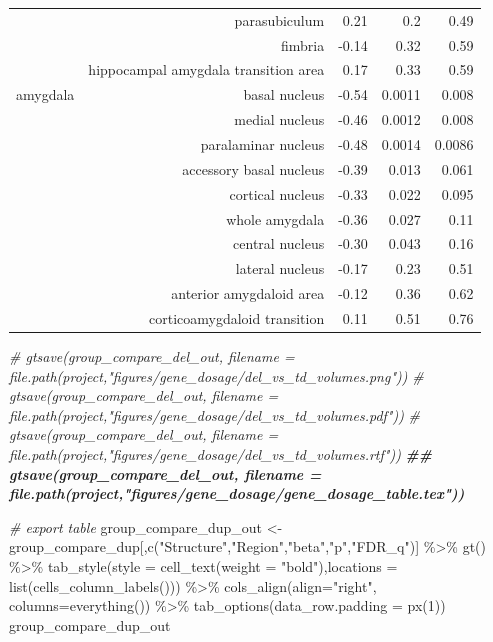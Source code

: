 \documentclass[
]{article}
\newenvironment{Shaded}{\begin{snugshade}}{\end{snugshade}}
\newcommand{\AttributeTok}[1]{\textcolor[rgb]{0.77,0.63,0.00}{#1}}
\newcommand{\CommentTok}[1]{\textcolor[rgb]{0.56,0.35,0.01}{\textit{#1}}}
\newcommand{\DecValTok}[1]{\textcolor[rgb]{0.00,0.00,0.81}{#1}}
\newcommand{\DocumentationTok}[1]{\textcolor[rgb]{0.56,0.35,0.01}{\textbf{\textit{#1}}}}
\newcommand{\FunctionTok}[1]{\textcolor[rgb]{0.00,0.00,0.00}{#1}}
\newcommand{\NormalTok}[1]{#1}
\newcommand{\OtherTok}[1]{\textcolor[rgb]{0.56,0.35,0.01}{#1}}
\newcommand{\SpecialCharTok}[1]{\textcolor[rgb]{0.00,0.00,0.00}{#1}}
\newcommand{\StringTok}[1]{\textcolor[rgb]{0.31,0.60,0.02}{#1}}
\begin{document}
\begin{longtable}{rrrrr}
 & parasubiculum & 0.21 & 0.2 & 0.49 \\ 
 & fimbria & -0.14 & 0.32 & 0.59 \\ 
 & hippocampal amygdala transition area & 0.17 & 0.33 & 0.59 \\ 
amygdala & basal nucleus & -0.54 & 0.0011 & 0.008 \\ 
 & medial nucleus & -0.46 & 0.0012 & 0.008 \\ 
 & paralaminar nucleus & -0.48 & 0.0014 & 0.0086 \\ 
 & accessory basal nucleus & -0.39 & 0.013 & 0.061 \\ 
 & cortical nucleus & -0.33 & 0.022 & 0.095 \\ 
 & whole amygdala & -0.36 & 0.027 & 0.11 \\ 
 & central nucleus & -0.30 & 0.043 & 0.16 \\ 
 & lateral nucleus & -0.17 & 0.23 & 0.51 \\ 
 & anterior amygdaloid area & -0.12 & 0.36 & 0.62 \\ 
 & corticoamygdaloid transition & 0.11 & 0.51 & 0.76 \\ 
\bottomrule
\end{longtable}

\begin{Shaded}
\begin{Highlighting}[]
\CommentTok{\# gtsave(group\_compare\_del\_out, filename = file.path(project,"figures/gene\_dosage/del\_vs\_td\_volumes.png"))}
\CommentTok{\# gtsave(group\_compare\_del\_out, filename = file.path(project,"figures/gene\_dosage/del\_vs\_td\_volumes.pdf"))}
\CommentTok{\# gtsave(group\_compare\_del\_out, filename = file.path(project,"figures/gene\_dosage/del\_vs\_td\_volumes.rtf"))}
\DocumentationTok{\#\# gtsave(group\_compare\_del\_out, filename = file.path(project,"figures/gene\_dosage/gene\_dosage\_table.tex"))}

\CommentTok{\# export table}
\NormalTok{group\_compare\_dup\_out }\OtherTok{\textless{}{-}}\NormalTok{ group\_compare\_dup[,}\FunctionTok{c}\NormalTok{(}\StringTok{"Structure"}\NormalTok{,}\StringTok{"Region"}\NormalTok{,}\StringTok{"beta"}\NormalTok{,}\StringTok{"p"}\NormalTok{,}\StringTok{"FDR\_q"}\NormalTok{)] }\SpecialCharTok{\%\textgreater{}\%} \FunctionTok{gt}\NormalTok{() }\SpecialCharTok{\%\textgreater{}\%} 
  \FunctionTok{tab\_style}\NormalTok{(}\AttributeTok{style =} \FunctionTok{cell\_text}\NormalTok{(}\AttributeTok{weight =} \StringTok{"bold"}\NormalTok{),}\AttributeTok{locations =} \FunctionTok{list}\NormalTok{(}\FunctionTok{cells\_column\_labels}\NormalTok{())) }\SpecialCharTok{\%\textgreater{}\%}
  \FunctionTok{cols\_align}\NormalTok{(}\AttributeTok{align=}\StringTok{"right"}\NormalTok{, }\AttributeTok{columns=}\FunctionTok{everything}\NormalTok{()) }\SpecialCharTok{\%\textgreater{}\%}
  \FunctionTok{tab\_options}\NormalTok{(}\AttributeTok{data\_row.padding =} \FunctionTok{px}\NormalTok{(}\DecValTok{1}\NormalTok{))}
\NormalTok{group\_compare\_dup\_out}
\end{Highlighting}
\end{Shaded}
\end{document}
